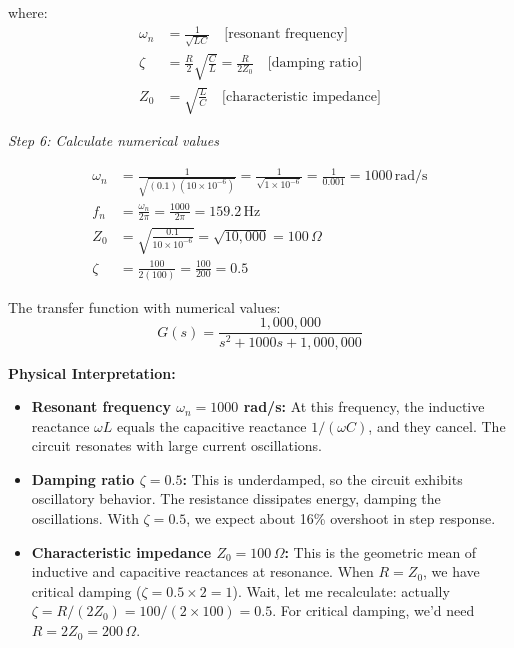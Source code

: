 \begin{example}
where:
\begin{align}
\omega_n &= \frac{1}{\sqrt{LC}} \quad \text{[resonant frequency]} \\
\zeta &= \frac{R}{2}\sqrt{\frac{C}{L}} = \frac{R}{2Z_0} \quad \text{[damping ratio]} \\
Z_0 &= \sqrt{\frac{L}{C}} \quad \text{[characteristic impedance]}
\end{align}

\textit{Step 6: Calculate numerical values}

\begin{align}
\omega_n &= \frac{1}{\sqrt{(0.1)(10 \times 10^{-6})}} = \frac{1}{\sqrt{1 \times 10^{-6}}} = \frac{1}{0.001} = 1000\,\text{rad/s} \\
f_n &= \frac{\omega_n}{2\pi} = \frac{1000}{2\pi} = 159.2\,\text{Hz} \\
Z_0 &= \sqrt{\frac{0.1}{10 \times 10^{-6}}} = \sqrt{10,000} = 100\,\Omega \\
\zeta &= \frac{100}{2(100)} = \frac{100}{200} = 0.5
\end{align}

The transfer function with numerical values:
\begin{equation}
\boxed{G(s) = \frac{1,000,000}{s^2 + 1000s + 1,000,000}}
\end{equation}

\textbf{Physical Interpretation:}

\begin{itemize}
    \item \textbf{Resonant frequency $\omega_n = 1000$ rad/s:} At this frequency, the inductive reactance $\omega L$ equals the capacitive reactance $1/(\omega C)$, and they cancel. The circuit resonates with large current oscillations.

    \item \textbf{Damping ratio $\zeta = 0.5$:} This is underdamped, so the circuit exhibits oscillatory behavior. The resistance dissipates energy, damping the oscillations. With $\zeta = 0.5$, we expect about 16\% overshoot in step response.

    \item \textbf{Characteristic impedance $Z_0 = 100\,\Omega$:} This is the geometric mean of inductive and capacitive reactances at resonance. When $R = Z_0$, we have critical damping ($\zeta = 0.5 \times 2 = 1$). Wait, let me recalculate: actually $\zeta = R/(2Z_0) = 100/(2 \times 100) = 0.5$. For critical damping, we'd need $R = 2Z_0 = 200\,\Omega$.


\end{itemize}
\end{example}
